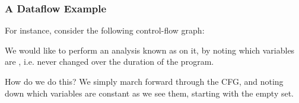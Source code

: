 \documentclass[aspectratio=169, handout]{beamer}
\begin{document}
 \begin{frame}[fragile]
   \frametitle{A Dataflow Example}

   \begin{center}
     \begin{minipage}{0.65\textwidth}
       \raggedright
       For instance, consider the following control-flow graph\footnotemark[13]:

       \vspace{10pt}

       We would like to perform an analysis known as 
       on it, by noting which variables are , i.e. never changed over
       the duration of the program.

       \vspace{10pt}

       How do we do this? We simply march forward through the CFG, and noting
       down which variables are constant as we see them, starting with the
       empty set.
     \end{minipage}
     \begin{minipage}{0.3\textwidth}
       \centering
     \end{minipage}
   \end{center}


 \end{frame}
\end{document}
